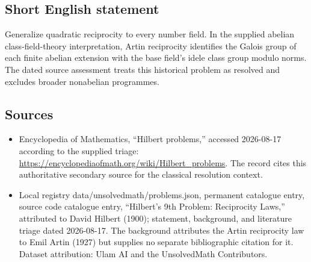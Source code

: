 \documentclass[11pt]{article}
\begin{document}
\subsection{Short English statement}
Generalize quadratic reciprocity to every number field. In the supplied abelian class-field-theory interpretation, Artin reciprocity identifies the Galois group of each finite abelian extension with the base field's idele class group modulo norms. The dated source assessment treats this historical problem as resolved and excludes broader nonabelian programmes.
\subsection{Sources}
\begin{itemize}
\item Encyclopedia of Mathematics, ``Hilbert problems,'' accessed 2026-08-17 according to the supplied triage: \url{https://encyclopediaofmath.org/wiki/Hilbert_problems}. The record cites this authoritative secondary source for the classical resolution context.
\item Local registry data/unsolvedmath/problems.json, permanent catalogue entry, source code catalogue entry, ``Hilbert's 9th Problem: Reciprocity Laws,'' attributed to David Hilbert (1900); statement, background, and literature triage dated 2026-08-17. The background attributes the Artin reciprocity law to Emil Artin (1927) but supplies no separate bibliographic citation for it. Dataset attribution: Ulam AI and the UnsolvedMath Contributors.
\end{itemize}
\end{document}
